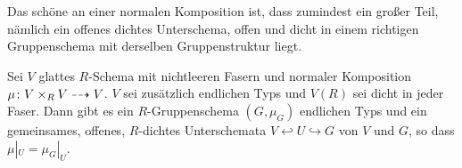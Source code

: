 \documentclass[german, bibliography=totoc]{scrreprt}
\begin{document}
Das schöne an einer normalen Komposition ist, dass zumindest
ein großer Teil, nämlich ein offenes dichtes Unterschema, offen und
dicht in einem richtigen Gruppenschema mit derselben Gruppenstruktur
liegt.
\begin{Satz}\label{thm:weil}
  Sei $V$ glattes $R$-Schema mit nichtleeren Fasern
  und normaler Komposition $\mu\colon V\times_R V\dashrightarrow V$.
  $V$ sei zusätzlich endlichen Typs und $V(R)$ sei dicht in jeder
  Faser. 
  Dann gibt es ein $R$-Gruppenschema $(G,\mu_G)$ endlichen Typs und
  ein gemeinsames, offenes, $R$-dichtes Unterschemata $V\hookleftarrow
  U\hookrightarrow G$ von $V$ und $G$, so dass $\mu|_U=\mu_G|_U$.
\end{Satz}
\end{document}
